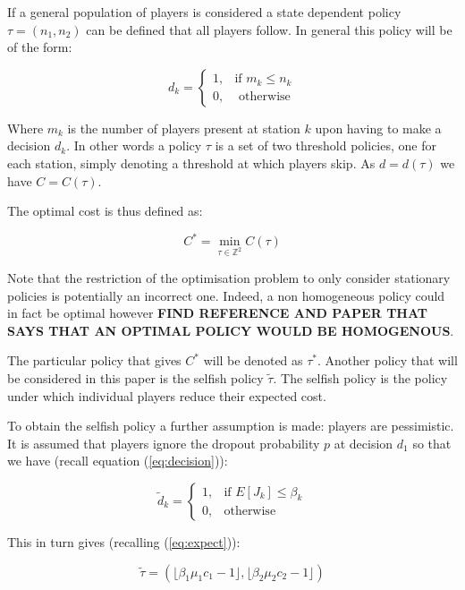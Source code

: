 \documentclass[12pt]{article}
\begin{document}
If a general population of players is considered a state dependent policy $\tau = (n_1, n_2)$ can be defined that all players follow.
In general this policy will be of the form:

$$d_k = \begin{cases}
1,& \text{if }m_k\leq n_k\\
0,&\text{ otherwise}
\end{cases}$$

Where $m_k$ is the number of players present at station $k$ upon having to make a decision $d_k$.
In other words a policy $\tau$ is a set of two threshold policies, one for each station, simply denoting a threshold at which players skip.
As $d=d(\tau)$ we have $C=C(\tau)$.

The optimal cost is thus defined as:

\begin{equation}\label{eq:optimal}
C^*=\min_{\tau\in\mathbb{Z}^2}C(\tau)
\end{equation}

Note that the restriction of the optimisation problem to only consider stationary policies is potentially an incorrect one.
Indeed, a non homogeneous policy could in fact be optimal however \textbf{FIND REFERENCE AND PAPER THAT SAYS THAT AN OPTIMAL POLICY WOULD BE HOMOGENOUS}.

The particular policy that gives $C^*$ will be denoted as $\tau^*$.
Another policy that will be considered in this paper is the selfish policy $\tilde\tau$.
The selfish policy is the policy under which individual players reduce their expected cost.

To obtain the selfish policy a further assumption is made: players are pessimistic.
It is assumed that players ignore the dropout probability $p$ at decision $d_1$ so that we have (recall equation (\ref{eq:decision})):

\begin{equation}\label{eq:selfishdecision}
    \tilde d_k=
\begin{cases}
    1,& \text{if } E[J_k] \leq \beta_k \\
    0,& \text{otherwise}
\end{cases}
\end{equation}

This in turn gives (recalling (\ref{eq:expect})):

\begin{equation}\label{eq:selfishpolicy}
\tilde\tau = \left(\lfloor\beta_1\mu_1 c_1 - 1\rfloor,\lfloor\beta_2\mu_2 c_2 - 1\rfloor\right)
\end{equation}
\end{document}

